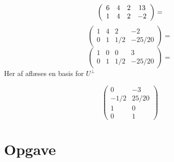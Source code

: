 \documentclass[12pt]{article}
\begin{document}
\begin{enumerate}[(a)]
$$
\left(\begin{array}{cccc} 6&4&2&13\\ 1&4&2&-2 \end{array}\right)=
$$
$$
\left(\begin{array}{cccc}
1&4&2&-2\\
0&1&1/2&-25/20
\end{array}\right)=
$$
$$
\left(\begin{array}{cccc}
1&0&0&3\\
0&1&1/2&-25/20
\end{array}\right)=
$$
Her af aflæses en basis for $U^\perp$

$$
\left(\begin{array}{cc}
0&-3\\
-1/2&25/20\\
1&0\\
0&1
\end{array}\right)
$$
\end{enumerate}
\section{Opgave}
\end{document}
